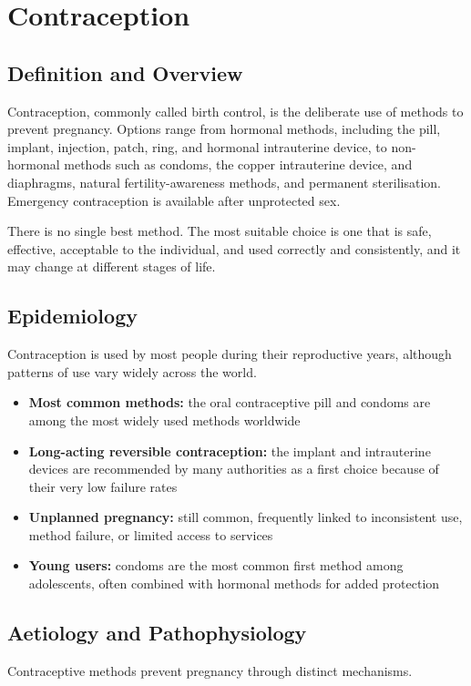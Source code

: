 \chapter{Contraception}

\section*{Definition and Overview}
Contraception, commonly called birth control, is the deliberate use of methods to prevent pregnancy. Options range from hormonal methods, including the pill, implant, injection, patch, ring, and hormonal intrauterine device, to non-hormonal methods such as condoms, the copper intrauterine device, and diaphragms, natural fertility-awareness methods, and permanent sterilisation. Emergency contraception is available after unprotected sex.

There is no single best method. The most suitable choice is one that is safe, effective, acceptable to the individual, and used correctly and consistently, and it may change at different stages of life.

\section*{Epidemiology}
Contraception is used by most people during their reproductive years, although patterns of use vary widely across the world.

\begin{itemize}
    \item \textbf{Most common methods:} the oral contraceptive pill and condoms are among the most widely used methods worldwide
    \item \textbf{Long-acting reversible contraception:} the implant and intrauterine devices are recommended by many authorities as a first choice because of their very low failure rates
    \item \textbf{Unplanned pregnancy:} still common, frequently linked to inconsistent use, method failure, or limited access to services
    \item \textbf{Young users:} condoms are the most common first method among adolescents, often combined with hormonal methods for added protection
\end{itemize}

\section*{Aetiology and Pathophysiology}
Contraceptive methods prevent pregnancy through distinct mechanisms.

